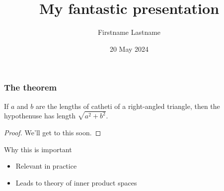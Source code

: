 \documentclass{beamer}
\title{My fantastic presentation}
\author[F.~Lastname]{Firstname Lastname}
\institute[U.~Puuhamaa]{University of Puuhamaa}
\date{20 May 2024}
\begin{document}
\maketitle


\begin{frame}
\frametitle{The theorem}

\begin{theorem}
If $a$ and $b$ are the lengths of catheti of a right-angled triangle,
then the hypothenuse has length $\sqrt{a^2 + b^2}$.
\end{theorem}
\begin{proof}
We'll get to this soon.
\end{proof}

\begin{block}{Why this is important}
\begin{itemize}
\item Relevant in practice
\item Leads to theory of inner product spaces
\end{itemize}
\end{block}

\end{frame}
\end{document}
